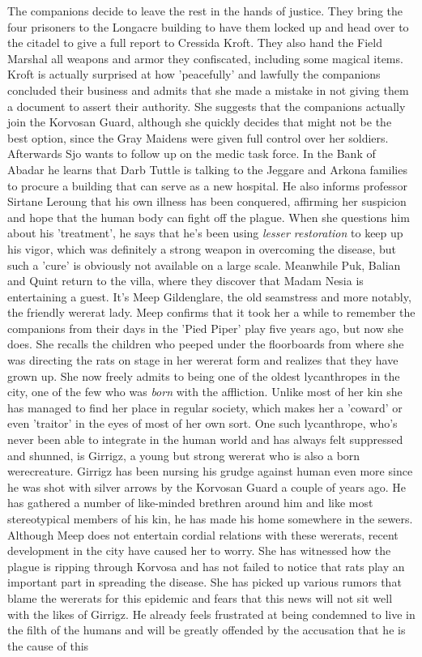 The companions decide to leave the rest in the hands of justice. They bring the four prisoners to the Longacre building to have them locked up and head over to the citadel to give a full report to Cressida Kroft. They also hand the Field Marshal all weapons and armor they confiscated, including some magical items. Kroft is actually surprised at how 'peacefully' and lawfully the companions concluded their business and admits that she made a mistake in not giving them a document to assert their authority. She suggests that the companions actually join the Korvosan Guard, although she quickly decides that might not be the best option, since the Gray Maidens were given full control over her soldiers.\\

Afterwards Sjo wants to follow up on the medic task force. In the Bank of Abadar he learns that Darb Tuttle is talking to the Jeggare and Arkona families to procure a building that can serve as a new hospital. He also informs professor Sirtane Leroung that his own illness has been conquered, affirming her suspicion and hope that the human body can fight off the plague. When she questions him about his 'treatment', he says that he's been using {\itshape lesser restoration} to keep up his vigor, which was definitely a strong weapon in overcoming the disease, but such a 'cure' is obviously not available on a large scale. Meanwhile Puk, Balian and Quint return to the villa, where they discover that Madam Nesia is entertaining a guest. It's Meep Gildenglare, the old seamstress and more notably, the friendly wererat lady. Meep confirms that it took her a while to remember the companions from their days in the 'Pied Piper' play five years ago, but now she does. She recalls the children who peeped under the floorboards from where she was directing the rats on stage in her wererat form and realizes that they have grown up. She now freely admits to being one of the oldest lycanthropes in the city, one of the few who was {\itshape born} with the affliction. Unlike most of her kin she has managed to find her place in regular society, which makes her a 'coward' or even 'traitor' in the eyes of most of her own sort. One such lycanthrope, who's never been able to integrate in the human world and has always felt suppressed and shunned, is Girrigz, a young but strong wererat who is also a born werecreature. Girrigz has been nursing his grudge against human even more since he was shot with silver arrows by the Korvosan Guard a couple of years ago. He has gathered a number of like-minded brethren around him and like most stereotypical members of his kin, he has made his home somewhere in the sewers. Although Meep does not entertain cordial relations with these wererats, recent development in the city have caused her to worry. She has witnessed how the plague is ripping through Korvosa and has not failed to notice that rats play an important part in spreading the disease. She has picked up various rumors that blame the wererats for this epidemic and fears that this news will not sit well with the likes of Girrigz. He already feels frustrated at being condemned to live in the filth of the humans and will be greatly offended by the accusation that he is the cause of this 